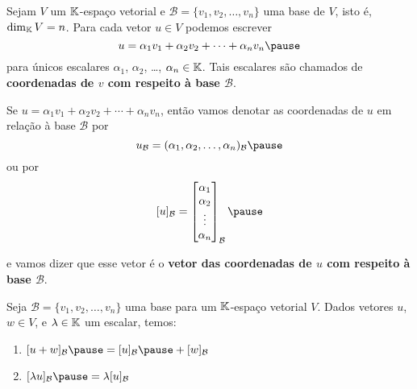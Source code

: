 \documentclass{beamer}
\begin{document}
\begin{frame}
  \begin{definicao}
    Sejam $V$ um $\mathbb{K}$-espaço vetorial \pause e $\mathcal{B} = \{v_1, v_2, \dots, v_n\}$ uma base de $V$, \pause isto é, $\dim_{\mathbb{K}}V = n$. \pause Para cada vetor $u \in V$ \pause podemos escrever
    \[
      u = \alpha_1v_1 + \alpha_2v_2 + \cdots + \alpha_nv_n\pause
    \]
    para únicos escalares \pause $\alpha_1$, $\alpha_2$, \dots, $\alpha_n \in \mathbb{K}$. \pause Tais escalares são chamados de \textbf{coordenadas de $v$ com respeito à base $\mathcal{B}$}.\pause
  \end{definicao}
\end{frame}

\begin{frame}
  \begin{notacao}
    Se $u = \alpha_1v_1 + \alpha_2v_2 + \cdots + \alpha_nv_n$, \pause então vamos denotar as coordenadas de $u$ \pause em relação à base $\mathcal{B}$ por\pause
    \[
      u_\mathcal{B} = (\alpha_1, \alpha_2, \dots, \alpha_n)_\mathcal{B}\pause
    \]
    ou por
    \[
      [u]_\mathcal{B} = \begin{bmatrix}\alpha_1\\\alpha_2\\ \vdots\\ \alpha_n\end{bmatrix}_\mathcal{B}\pause
    \]

    e vamos dizer que esse vetor \pause é o \textbf{vetor das coordenadas de $u$ com respeito à base $\mathcal{B}$}.
  \end{notacao}
\end{frame}

\begin{frame}
  \begin{teorema}
    Seja $\mathcal{B} = \{v_1, v_2, \dots, v_n\}$ uma base \pause para um $\mathbb{K}$-espaço vetorial $V$. \pause Dados vetores $u$, $w \in V$, \pause e $\lambda \in \mathbb{K}$ um escalar, temos: \pause
    \begin{enumerate}[label={\roman*})]
      \vspace{.2cm}

      \item $[u + w]_\mathcal{B} \pause = [u]_\mathcal{B} \pause + [w]_\mathcal{B}$ \pause

      \vspace{1cm}

      \item $[\lambda u]_\mathcal{B} \pause = \lambda[u]_\mathcal{B}$
    \end{enumerate}
  \end{teorema}
\end{frame}
\end{document}

